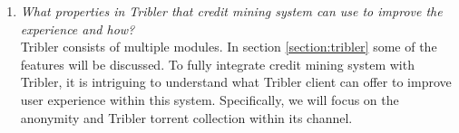 \begin{enumerate}
	\item \textit{What properties in Tribler that credit mining system can use to improve the experience and how?}
	\\ Tribler consists of multiple modules. In section \ref{section:tribler} some of the features will be discussed. To fully integrate credit mining system with Tribler, it is intriguing to understand what Tribler client can offer to improve user experience within this system. Specifically, we will focus on the anonymity and Tribler torrent collection within its channel.
\end{enumerate}

%

